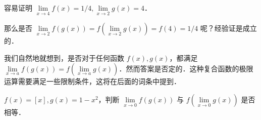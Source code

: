   容易证明 $\lim\limits_{x\rightarrow 4}f(x)=1/4,\lim\limits_{x\rightarrow 2}g(x)=4$．

  那么是否 $\lim\limits_{x\rightarrow 2}f(g(x))=f(\lim\limits_{x\rightarrow 2}g(x))=f(4)=1/4$ 呢？经验证是成立的．

  我们自然地就想到，是否对于任何函数 $f(x),g(x)$，都满足 $\lim\limits_{x\rightarrow a}f(g(x))=f(\lim\limits_{x\rightarrow a}g(x))$．然而答案是否定的．这种复合函数的极限运算需要满足一些限制条件，这将在后面的词条中提到．
\begin{exercise}{}
$f(x)=[x],g(x)=1-x^2$，判断 $\lim\limits_{x\rightarrow 0}f(g(x)) $ 与 $f(\lim\limits_{x\rightarrow 0}g(x))$ 是否相等．
\end{exercise}